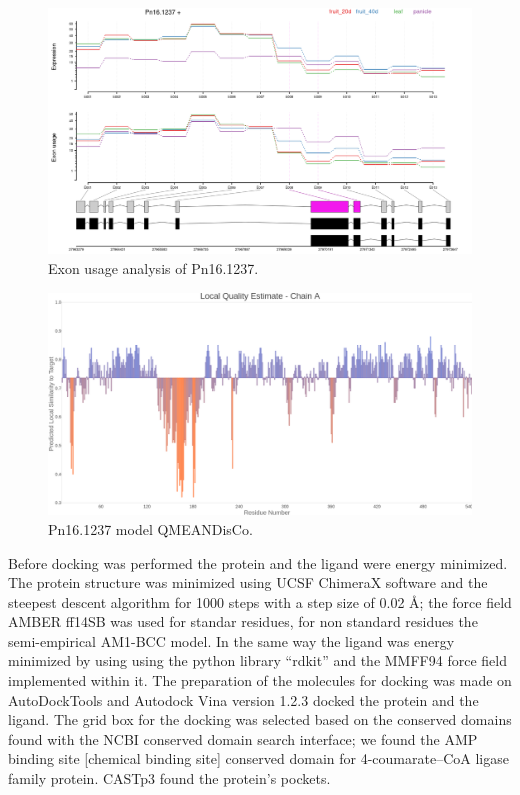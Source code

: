 \documentclass[12pt]{article}
\begin{document}
	\FloatBarrier
	\begin{figure}
		\centering
		\includegraphics[width=\textwidth-50pt]{../6/known/Transcripts/7.png}
		\caption{Exon usage analysis of Pn16.1237.}
		\label{fig6k_1}
	\end{figure}
	\FloatBarrier
	
	\FloatBarrier
	\begin{figure}
		\centering
		\includegraphics[width=\textwidth-50pt]{../6/known/Swiss/Local_quality_estimate.png}
		\caption{Pn16.1237 model QMEANDisCo.}
		\label{fig6k_3}
	\end{figure}
	\FloatBarrier
	
	\newpage
	
	Before docking was performed the protein and the ligand were energy minimized. The protein structure was minimized using UCSF ChimeraX software \cite{chimera,chimera_2} and the steepest descent algorithm for 1000 steps with a step size of 0.02 \r{A}; the force field AMBER ff14SB was used for standar residues, for non standard residues the semi-empirical AM1-BCC model. \cite{am1_bcc,am1_bcc_2,am1_bcc_3} In the same way the ligand was energy minimized by using using the python library ``rdkit'' and the MMFF94 force field implemented within it. \cite{rdkit,rdkit_mmff}	The preparation of the molecules for docking was made on AutoDockTools and Autodock Vina version 1.2.3 docked the protein and the ligand. \cite{adt,vina,vina_2} The grid box for the docking was selected based on the conserved domains found with the NCBI conserved domain search interface; we found the AMP binding site [chemical binding site] conserved domain for 4-coumarate--CoA ligase family protein. \cite{cdd,cdd_2}  CASTp3 found the protein's pockets.
	
\end{document}
